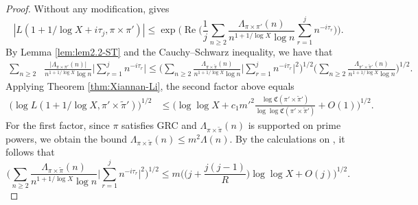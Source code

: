 \documentclass[12pt,reqno]{amsart}
\theoremstyle{remark}
\DeclareMathOperator{\Real}{Re}
\numberwithin{equation}{section}
\begin{document}
	\begin{proof}
		Without any modification, \cite[Lemma 5.1]{S} gives 
		\begin{equation}\label{eq:lem5.1-sound}
			|L(1+1/\log X+i\tau_j, \pi \times \pi')| 
			\le \exp\Big(\Real \Big(\frac{1}{j}\sum_{n \ge 2} \frac{\Lambda_{\pi \times \pi'}(n)}{n^{1+1/\log X}\log n}\sum_{r=1}^{j}n^{-i\tau_r} \Big)\Big).
		\end{equation}
		By Lemma \ref{lem:lem2.2-ST} and the Cauchy--Schwarz inequality, we have that
	\begin{equation*}
	\begin{aligned}
		\sum_{n \ge 2} &\frac{|\Lambda_{\pi \times \pi'}(n)|}{n^{1+1/\log X}\log n}\Big|\sum_{r=1}^{j} n^{-i\tau_r}\Big| 
        \le \Big(\sum_{n \ge 2} \frac{\Lambda_{\pi \times \widetilde{\pi}}(n)}{n^{1+1/\log X}\log n}\Big|\sum_{r=1}^{j} n^{-i\tau_r}\Big|^2\Big)^{1/2} \Big(\sum_{n \ge 2} \frac{\Lambda_{\pi' \times \widetilde{\pi}'}(n)}{n^{1+1/\log X}\log n}\Big)^{1/2}.
	\end{aligned}
    \end{equation*}
     Applying Theorem \ref{thm:Xiannan-Li}, the second factor above equals
        \begin{equation}
        \label{eq:lem5.1-sound-3} 
	\begin{aligned}
            \big(\log L(1+1/{\log X}, \pi' \times \widetilde{\pi}')\big)^{1/2} &\le \Big(\log\log X + c_1m'^2 \frac{\log\mathfrak{C}(\pi' \times \widetilde{\pi}')}{\log\log\mathfrak{C}(\pi' \times \widetilde{\pi}')}+O(1)\Big)^{1/2}.
		\end{aligned}
	\end{equation} 
     For the first factor, since $\pi$ satisfies GRC and  $\Lambda_{\pi \times \widetilde{\pi}}(n)$ is supported on prime powers, we obtain the bound $\Lambda_{\pi \times \widetilde{\pi}}(n) \le m^2\Lambda(n)$. By the calculations on \cite[p. 1488]{S}, it follows that  \begin{equation}\label{eq:lem5.1-sound-2}
       \Big(\sum_{n \ge 2} \frac{\Lambda_{\pi \times \widetilde{\pi}}(n)}{n^{1+1/\log X}\log n}\Big|\sum_{r=1}^{j} n^{-i\tau_r}\Big|^2\Big)^{1/2}
        \le m\Big(\Big(j +\frac{j(j-1)}{R}\Big)\log\log X + O(j) \Big)^{1/2}.
	\end{equation}
    

\end{proof}
\end{document}
